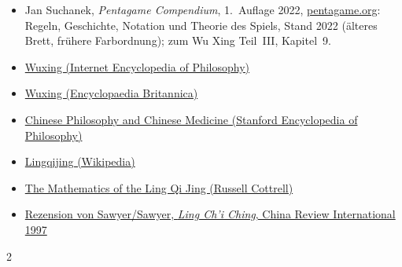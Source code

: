 \documentclass[12pt,paper=a5,DIV=13,headings=small,twoside=true,open=any]{scrbook}
\makeatletter
\newcommand\spruchverzeichnis{\@starttoc{ver}}
\makeatother
\begin{document}
\begin{itemize}[leftmargin=*, itemsep=0pt]
  \item Jan Suchanek, \textit{Pentagame Compendium}, 1.~Auflage 2022, \href{https://pentagame.org}{pentagame.org}: Regeln, Geschichte, Notation und Theorie des Spiels, Stand 2022 (älteres Brett, frühere Farbordnung); zum Wu Xing Teil~III, Kapitel~9.
  \item \href{https://iep.utm.edu/wuxing/}{Wuxing (Internet Encyclopedia of Philosophy)}
  \item \href{https://www.britannica.com/topic/wuxing}{Wuxing (Encyclopaedia Britannica)}
  \item \href{https://plato.stanford.edu/entries/chinese-phil-medicine/}{Chinese Philosophy and Chinese Medicine (Stanford Encyclopedia of Philosophy)}
  \item \href{https://en.wikipedia.org/wiki/Lingqijing}{Lingqijing (Wikipedia)}
  \item \href{https://russellcottrell.com/VirtualYarrowStalks/LingQiJing.htm}{The Mathematics of the Ling Qi Jing (Russell Cottrell)}
  \item \href{https://muse.jhu.edu/article/397150/summary}{Rezension von Sawyer/Sawyer, \textit{Ling Ch’i Ching}, China Review International 1997}
\end{itemize}


{\footnotesize\setlength{\columnsep}{1.5em}
\begin{multicols}{2}
\raggedcolumns
\spruchverzeichnis
\end{multicols}}
\end{document}
